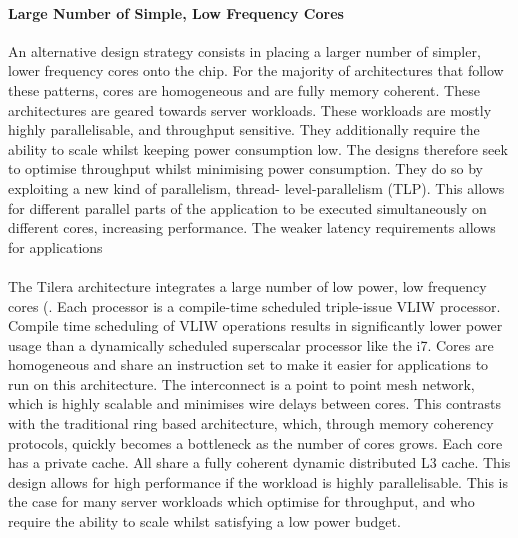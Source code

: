 \paragraph{Large Number of Simple, Low Frequency Cores} An alternative
design strategy consists in placing a larger number of simpler, lower frequency cores
onto the chip. For the majority of architectures that follow these patterns, 
cores are homogeneous and are fully memory coherent. These architectures are
geared towards server workloads. These workloads are mostly highly parallelisable,
and throughput sensitive. They additionally require the ability
to scale whilst keeping power consumption low. 
 The designs therefore seek to optimise throughput whilst minimising power
consumption. They do so by exploiting a new kind of parallelism, thread-
level-parallelism (TLP). This allows for different parallel parts of the application
to be executed simultaneously on different cores, increasing performance. The
weaker latency requirements allows for applications

\paragraph{} The Tilera architecture integrates a large number of low power, 
low frequency cores (. Each processor is a compile-time scheduled 
triple-issue VLIW processor.
Compile time scheduling of VLIW operations results in significantly
lower power usage than a dynamically scheduled superscalar
processor like the i7. Cores are homogeneous and share 
an instruction set to make it easier for applications to run on
this architecture.  The interconnect is a point to point mesh network, which
is highly scalable and minimises wire delays between cores. This
contrasts with the traditional ring based architecture, which,
through memory coherency protocols, quickly becomes a bottleneck
as the number of cores grows. Each
core has a private cache. All share a fully coherent dynamic
distributed L3 cache.  This design allows for high performance
if the workload is highly parallelisable. This is the case for many 
server workloads which optimise for throughput, and who require
the ability to scale whilst satisfying a low power budget.  

